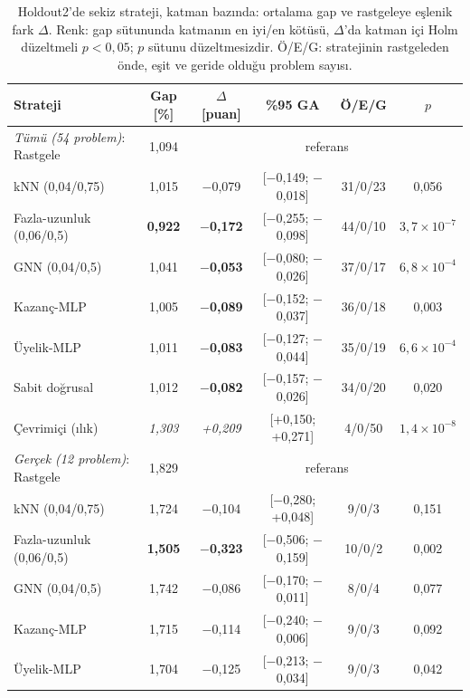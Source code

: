 \documentclass[pdflatex,sn-basic]{sn-jnl}
\newcommand{\iyi}[1]{\textcolor{iyiRenk}{\textbf{#1}}}
\newcommand{\kotu}[1]{\textcolor{kotuRenk}{\textit{#1}}}
\begin{document}
\begin{table}[!htbp]
\centering\small\setlength{\tabcolsep}{3pt}
\caption{Holdout2'de sekiz strateji, katman bazında: ortalama gap ve rastgeleye eşlenik fark $\Delta$. Renk: gap sütununda katmanın en iyi/en kötüsü, $\Delta$'da katman içi Holm düzeltmeli $p<0{,}05$; $p$ sütunu düzeltmesizdir. Ö/E/G: stratejinin rastgeleden önde, eşit ve geride olduğu problem sayısı.}
\label{tab:v3-strategies}
\begin{tabular*}{\textwidth}{@{\extracolsep{\fill}}lccccc@{}}
\toprule
Strateji & Gap [\%] & $\Delta$ [puan] & \%95 GA & Ö/E/G & $p$ \\
\midrule
\textit{Tümü (54 problem)}: Rastgele & 1{,}094 & \multicolumn{4}{c}{referans} \\
\quad kNN (0,04/0,75) & 1{,}015 & $-$0{,}079 & [$-$0{,}149; $-$0{,}018] & 31/0/23 & 0{,}056 \\
\quad Fazla-uzunluk (0,06/0,5) & \iyi{0{,}922} & \iyi{$-$0{,}172} & [$-$0{,}255; $-$0{,}098] & 44/0/10 & $3{,}7\times10^{-7}$ \\
\quad GNN (0,04/0,5) & 1{,}041 & \iyi{$-$0{,}053} & [$-$0{,}080; $-$0{,}026] & 37/0/17 & $6{,}8\times10^{-4}$ \\
\quad Kazanç-MLP & 1{,}005 & \iyi{$-$0{,}089} & [$-$0{,}152; $-$0{,}037] & 36/0/18 & 0{,}003 \\
\quad Üyelik-MLP & 1{,}011 & \iyi{$-$0{,}083} & [$-$0{,}127; $-$0{,}044] & 35/0/19 & $6{,}6\times10^{-4}$ \\
\quad Sabit doğrusal & 1{,}012 & \iyi{$-$0{,}082} & [$-$0{,}157; $-$0{,}026] & 34/0/20 & 0{,}020 \\
\quad Çevrimiçi (ılık) & \kotu{1{,}303} & \kotu{+0{,}209} & [+0{,}150; +0{,}271] & 4/0/50 & $1{,}4\times10^{-8}$ \\
\addlinespace
\textit{Gerçek (12 problem)}: Rastgele & 1{,}829 & \multicolumn{4}{c}{referans} \\
\quad kNN (0,04/0,75) & 1{,}724 & $-$0{,}104 & [$-$0{,}280; +0{,}048] & 9/0/3 & 0{,}151 \\
\quad Fazla-uzunluk (0,06/0,5) & \iyi{1{,}505} & \iyi{$-$0{,}323} & [$-$0{,}506; $-$0{,}159] & 10/0/2 & 0{,}002 \\
\quad GNN (0,04/0,5) & 1{,}742 & $-$0{,}086 & [$-$0{,}170; $-$0{,}011] & 8/0/4 & 0{,}077 \\
\quad Kazanç-MLP & 1{,}715 & $-$0{,}114 & [$-$0{,}240; $-$0{,}006] & 9/0/3 & 0{,}092 \\
\quad Üyelik-MLP & 1{,}704 & $-$0{,}125 & [$-$0{,}213; $-$0{,}034] & 9/0/3 & 0{,}042 \\

\end{tabular*}
\end{table}
\end{document}
